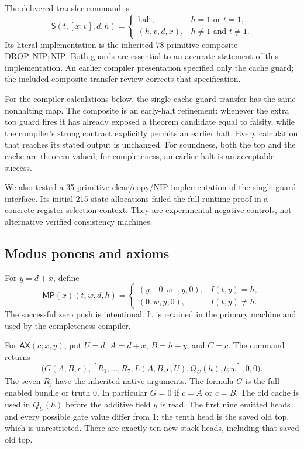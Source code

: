 \documentclass[11pt]{article}
\newcommand{\AX}{\mathsf{AX}}
\newcommand{\MP}{\mathsf{MP}}
\newcommand{\SSS}{\mathsf S}
\begin{document}
The delivered transfer command is
\[
 \SSS(t,[x;v],d,h)=
 \begin{cases}
   \mathrm{halt},&h=1\text{ or }t=1,\\
   (h,v,d,x),&h\ne1\text{ and }t\ne1.
 \end{cases}                                                   \tag{1}
\]
Its literal implementation is the inherited 78-primitive composite
$\mathrm{DROP};\mathrm{NIP};\mathrm{NIP}$. Both guards are essential to an accurate statement of this implementation. An earlier compiler presentation specified only the cache guard; the included composite-transfer review corrects that specification.

For the compiler calculations below, the single-cache-guard transfer has the same nonhalting map. The composite is an early-halt refinement: whenever the extra top guard fires it has already exposed a theorem candidate equal to falsity, while the compiler's strong contract explicitly permits an earlier halt. Every calculation that reaches its stated output is unchanged. For soundness, both the top and the cache are theorem-valued; for completeness, an earlier halt is an acceptable success.

We also tested a 35-primitive clear/copy/NIP implementation of the single-guard interface. Its initial 215-state allocations failed the full runtime proof in a concrete register-selection context. They are experimental negative controls, not alternative verified consistency machines.

\subsection{Modus ponens and axioms}

For $y=d+x$, define
\[
 \MP(x)(t,w,d,h)=
 \begin{cases}
 (y,[0;w],y,0),&I(t,y)=h,\\
 (0,w,y,0),&I(t,y)\ne h.
 \end{cases}                                                    \tag{2}
\]
The successful zero push is intentional. It is retained in the primary machine and used by the completeness compiler.

For $\AX(c;x,y)$, put $U=d$, $A=d+x$, $B=h+y$, and $C=c$. The command returns
\[
 \bigl(G(A,B,c),
 [R_1,\ldots,R_7,L(A,B,c,U),Q_U(h),t;w],0,0\bigr).               \tag{3}
\]
The seven $R_j$ have the inherited native arguments. The formula $G$ is the full enabled bundle or truth 0. In particular $G=0$ if $c=A$ or $c=B$. The old cache is used in $Q_U(h)$ before the additive field $y$ is read. The first nine emitted heads and every possible gate value differ from 1; the tenth head is the saved old top, which is unrestricted. There are exactly ten new stack heads, including that saved old top.
\end{document}
